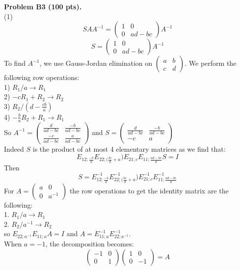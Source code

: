 \documentclass[12pt]{article}
\begin{document}
\vspace {0.25cm}\noindent
{\bf Problem B3 (100 pts).}\\
(1) 
$$ S A A^{-1} = \begin{pmatrix}
1 & 0 \\ 0 & ad - bc
\end{pmatrix}A^{-1}$$
$$ S = \begin{pmatrix}
1 & 0 \\ 0 & ad - bc
\end{pmatrix}A^{-1}$$
To find $A^{-1}$, we use Gauss-Jordan elimination on $\begin{pmatrix}
a & b \\ c & d
\end{pmatrix}$.
We perform the following row operations:\\
1) $R_1/a \rightarrow R_1$\\
2) $-cR_1 + R_2 \rightarrow R_2$\\
3) $R_2/(d - \frac{cb}{a}) $\\
4) $-\frac{b}{a}R_2 + R_1 \rightarrow R_1$\\ 
So $A^{-1} = \begin{pmatrix}
\frac{d}{ad - bc} & \frac{-b}{ad - bc}\\
\frac{-c}{ad - bc} & \frac{a}{ad - bc}
\end{pmatrix}$ and $S = \begin{pmatrix}
\frac{d}{ad - bc} & \frac{-b}{ad - bc}\\
-c & a
\end{pmatrix}$
\\ 
Indeed $S$ is the product of at most 4 elementary matrices as we find that:
$$E_{12;\frac{-b}{d}}E_{22;(\frac{bc}{d} +a})E_{21;c}E_{11;\frac{ad - bc}{d}}S = I$$
Then $$ S = E^{-1}_{12;\frac{-b}{d}}E^{-1}_{22;(\frac{bc}{d} +a})E^{-1}_{21;c}E^{-1}_{11;\frac{ad - bc}{d}}$$
For $A = \begin{pmatrix}
a & 0 \\ 0 & a^{-1}
\end{pmatrix}$ the row operations to get the identity matrix are the following:\\
1. $R_1/a \rightarrow R_1$\\
2. $R_2/a^{-1} \rightarrow R_2 $\\

so $E_{22; a^{-1}} E_{11; a} A = I $ and 
$A = E^{-1}_{11; a}E^{-1}_{22; a^{-1}}$.\\
When $a = -1$, the decomposition becomes:
$$\begin{pmatrix}
-1 & 0 \\ 0 & 1
\end{pmatrix}\begin{pmatrix}
1 & 0 \\ 0 & -1
\end{pmatrix} = A$$
\end{document}
